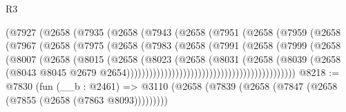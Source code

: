 \begin{lexlean}{R3}
\begin{coremodule}
                                (@7927
                                  (@2658
                                    (@7935
                                      (@2658
                                        (@7943
                                          (@2658
                                            (@7951
                                              (@2658
                                                (@7959
                                                  (@2658
                                                    (@7967
                                                      (@2658
                                                        (@7975
                                                          (@2658
                                                            (@7983
                                                              (@2658
                                                                (@7991
                                                                  (@2658
                                                                    (@7999
                                                                      (@2658
                                                                        (@8007
                                                                          (@2658
                                                                            (@8015
                                                                              (@2658
                                                                                (@8023
                                                                                  (@2658
                                                                                    (@8031
                                                                                      (@2658
                                                                                        (@8039
                                                                                          (@2658
                                                                                            (@8043
                                                                                              @8045
                                                                                              @2679
                                                                                              @2654)))))))))))))))))))))))))))))))))))))))))))))
@8218 := @7830
    (fun (__b : @2461) =>
    @3110 (@2658 (@7839 (@2658 (@7847 (@2658 (@7855 (@2658 (@7863 @8093)))))))))

\end{coremodule}
\end{lexlean}
